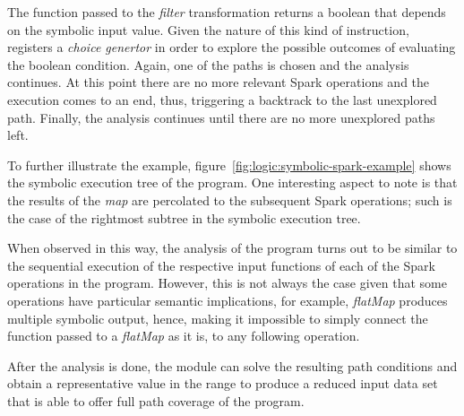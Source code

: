 The function passed to the \textit{filter} transformation returns a boolean that depends on the symbolic input value. Given the nature of this kind of instruction, \spf registers a \textit{choice genertor} in order to explore the possible outcomes of evaluating the boolean condition. Again, one of the paths is chosen and the analysis continues. At this point there are no more relevant Spark operations and the execution comes to an end, thus, triggering a backtrack to the last unexplored path. Finally, the analysis continues until there are no more unexplored paths left.

To further illustrate the example, figure~\ref{fig:logic:symbolic-spark-example} shows the symbolic execution tree of the program. One interesting aspect to note is that the results of the \textit{map} are percolated to the subsequent Spark operations; such is the case of the rightmost subtree in the symbolic execution tree. 

When observed in this way, the analysis of the program turns out to be similar to the sequential execution of the respective input functions of each of the Spark operations in the program. However, this is not always the case given that some operations have particular semantic implications, for example, \textit{flatMap} produces multiple symbolic output, hence, making it impossible to simply connect the function passed to a \textit{flatMap} as it is, to any following operation.

After the analysis is done, the module can solve the resulting path conditions and obtain a representative value in the range to produce a reduced input data set that is able to offer full path coverage of the program.



